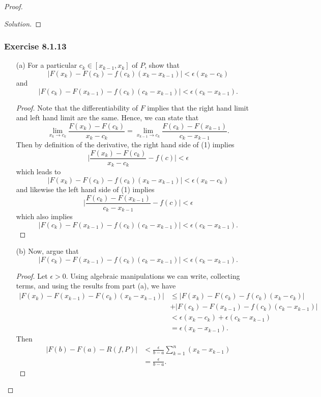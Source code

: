 \begin{proof}
\begin{proof}[Solution]
\end{proof}


\subsubsection{Exercise 8.1.13} 

\begin{enumerate}
    \item[(a)] For a particular \( c_{k } \in [x_{k-1}, x_{k } ]  \) of \( P  \), show that  
\[  | F(x_{k }) - F(c_{k}) - f(c_{k })(x_{k } - x_{k-1})  | < \epsilon ( x_{k } - c_{k }) \] and 
\[  | F(c_{k}) - F(x_{k-1}) - f(c_{k })(c_{k} - x_{k-1})   | <  \epsilon (c_{k } -  x_{k-1}). \]
\begin{proof}
Note that the differentiability of \( F \) implies that the right hand limit and left hand limit are the same. Hence, we can state that 
\[ \lim_{ x_{k}  \to c_{k }  }  \frac{ F(x_{k } ) - F(c_{k })  }{ x_{k } - c_{k}  } = \lim_{ x_{k-1}  \to c_{k }  } \frac{ F(c_{k }) - F(x_{k-1}) }{ c_{k } - x_{k-1} }. \tag{1}  \] Then by definition of the derivative, the right hand side of (1) implies
\[  \Big| \frac{ F(x_{k } ) - F(c_{k }) }{ x_{k } - c_{k } }  - f(c)  \Big| < \epsilon  \] which leads to 
\[  | F(x_{k }) - F(c_{k}) - f(c_{k })(x_{k } - x_{k-1})  | < \epsilon ( x_{k } - c_{k }) \] and  likewise the left hand side of (1) implies
\[  \Big| \frac{ F(c_{k } ) - F(x_{k-1}) }{ c_{k} - x_{k-1} } - f(c) \Big| < \epsilon \] which also implies 
\[  | F(c_{k}) - F(x_{k-1}) - f(c_{k })(c_{k} - x_{k-1})   | <  \epsilon (c_{k } -  x_{k-1}). \]
\end{proof}
    \item[(b)] Now, argue that 
        \[  | F(c_{k }) - F(x_{k-1}) - f(c_{k } )(c_{k} - x_{k-1}) | < \epsilon (c_{k } - x_{k-1}). \]
        \begin{proof}
        Let \( \epsilon > 0  \). Using algebraic manipulations we can write, collecting terms, and using the results from part (a), we have
        \begin{align*}
            | F(x_{k}) - F(x_{k-1}) -F(c_{k})(x_{k } - x_{k-1}) | &\leq | F(x_{k}) - F(c_{k } ) - f(c_{k}  ) (x_{k } - c_{k }) | \\&+ | F(c_{k})  - F(x_{k-1}) - f(c_{k }) (c_{k} - x_{k-1}) |   \\
                                                                  &< \epsilon (x_{k } - c_{k }) + \epsilon(c_{k } - x_{k-1}) \\
                                                                  &= \epsilon(x_{k } - x_{k-1}).
        \end{align*}
        Then 
        \begin{align*}
            | F(b) - F(a) - R(f,P)   | &<  \frac{ \epsilon  }{ b -a  }  \sum_{ k=1 }^{ n } ( x_{k } - x_{k-1}) \\
                                       &= \frac{ \epsilon  }{ b - a   }.
        \end{align*}
        \end{proof}
\end{enumerate}
\end{proof}

